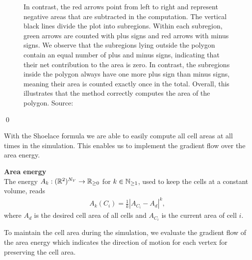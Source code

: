 \begin{proposition}
\begin{figure}
\begin{center}
{				In contrast, the red arrows point from left to right and represent negative areas that are subtracted in the computation.
				The vertical black lines divide the plot into subregions.
				Within each subregion, green arrows are counted with plus signs and red arrows with minus signs.
				We observe that the subregions lying outside the polygon contain an equal number of plus and minus signs, indicating that their net contribution to the area is zero.
				In contrast, the subregions inside the polygon always have one more plus sign than minus signs, meaning their area is counted exactly once in the total.
				Overall, this illustrates that the method correctly computes the area of the polygon.
				Source:~\cite{ShoelaceFigure2022}}
			\label{fig:shoelace}
		\end{center}
	\end{figure}
	\qed
\end{proposition}

With the Shoelace formula we are able to easily compute all cell areas at all times in the simulation. 
This enables us to implement the gradient flow over the area energy. 

\begin{definition} \textbf{Area energy} \\
The energy $A_k: (\mathbb{R}^2)^{N_V} \rightarrow \mathbb{R}_{\geq 0}$ for $k \in \mathbb{N}_{\geq 1}$, used to keep the cells at a constant volume, reads 
	\begin{align}
		A_k(C_i) = \frac{1}{k} |A_{C_i} - A_d|^k, \label{eq:areaEnergy} 
	\end{align}
	where $A_d$ is the desired cell area of all cells and $A_{C_i}$ is the current area of cell $i$. 
\end{definition}

To maintain the cell area during the simulation, we evaluate the gradient flow of the area energy which indicates the direction of motion for each vertex for preserving the cell area.

